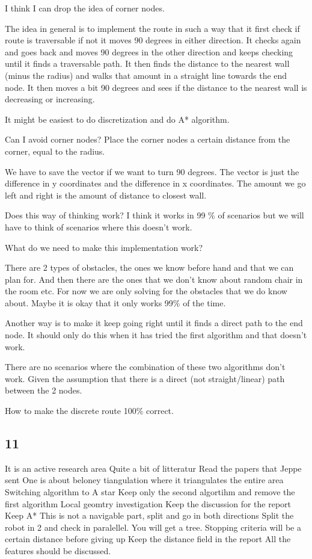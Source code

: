 I think I can drop the idea of corner nodes.

The idea in general is to implement the route in such a way that it first check if route is traversable if not it moves 90 degrees in either direction. It checks again and goes back and moves 90 degrees in the other direction and keeps checking until it finds a traversable path. It then finds the distance to the nearest wall (minus the radius) and walks that amount in a straight line towards the end node. It then moves a bit 90 degrees and sees if the distance to the nearest wall is decreasing or increasing.

It might be easiest to do discretization and do A* algorithm.


Can I avoid corner nodes?
Place the corner nodes a certain distance from the corner, equal to the radius.

We have to save the vector if we want to turn 90 degrees.
The vector is just the difference in y coordinates and the difference in x coordinates.
The amount we go left and right is the amount of distance to closest wall.

Does this way of thinking work?
I think it works in 99 \% of scenarios but we will have to think of scenarios where this doesn't work.

What do we need to make this implementation work?

There are 2 types of obstacles, the ones we know before hand and that we can plan for.
And then there are the ones that we don't know about random chair in the room etc.
For now we are only solving for the obstacles that we do know about.
Maybe it is okay that it only works 99\% of the time.

Another way is to make it keep going right until it finds a direct path to the end node.
It should only do this when it has tried the first algorithm and that doesn't work.

There are no scenarios where the combination of these two algorithms don't work.
Given the assumption that there is a direct (not straight/linear) path between the 2 nodes.

How to make the discrete route 100\% correct.

\subsection{11}
It is an active research area
Quite a bit of litteratur 
Read  the papers that Jeppe sent
One is about beloney tiangulation where it triangulates the entire area
Switching algorithm to A star
Keep only the second algortihm and remove the first algorithm
Local geomtry investigation
Keep the discussion for the report
Keep A*
This is not a navigable part, split and go in both directions
Split the robot in 2 and check in paralellel. You will get a tree.
Stopping criteria  will be a certain distance before giving up
Keep the distance field in the report
All the features should be discussed. 


